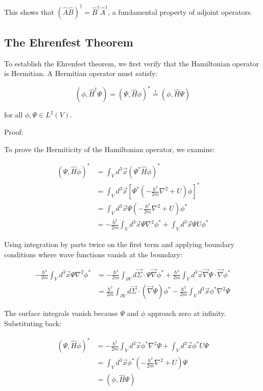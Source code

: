This shows that $(\hat{A}\hat{B})^\dagger = \hat{B}^\dagger\hat{A}^\dagger$, a fundamental property of adjoint operators.

\subsection{The Ehrenfest Theorem}

To establish the Ehrenfest theorem, we first verify that the Hamiltonian operator is Hermitian. A Hermitian operator must satisfy:

\begin{equation}
(\phi, \hat{H}^\dagger\Psi) = (\Psi, \hat{H}\phi)^* \stackrel{!}{=} (\phi, \hat{H}\Psi)
\end{equation}

for all $\phi, \Psi \in L^2(V)$.

Proof:


To prove the Hermiticity of the Hamiltonian operator, we examine:

\begin{align}
(\Psi, \hat{H}\phi)^* &= \int_V d^3\vec{x}(\Psi^*\hat{H}\phi)^* \\
&= \int_V d^3\vec{x}\left[\Psi^*\left(-\frac{\hbar^2}{2m}\nabla^2 + U\right)\phi\right]^* \\
&= \int_V d^3\vec{x}\Psi\left(-\frac{\hbar^2}{2m}\nabla^2 + U\right)\phi^*  \\
&= -\frac{\hbar^2}{2m}\int_V d^3\vec{x}\Psi\nabla^2\phi^* + \int_V d^3\vec{x}\Psi U\phi^*
\end{align}

Using integration by parts twice on the first term and applying boundary conditions where wave functions vanish at the boundary:

\begin{align}
-\frac{\hbar^2}{2m}\int_V d^3\vec{x}\Psi\nabla^2\phi^* &= -\frac{\hbar^2}{2m}\int_{\partial V}d\vec{\Sigma}\cdot\Psi\vec{\nabla}\phi^* + \frac{\hbar^2}{2m}\int_V d^3\vec{x}\vec{\nabla}\Psi\cdot\vec{\nabla}\phi^*  \\
&= \frac{\hbar^2}{2m}\int_{\partial V}d\vec{\Sigma}\cdot(\vec{\nabla}\Psi)\phi^* - \frac{\hbar^2}{2m}\int_V d^3\vec{x}\phi^*\nabla^2\Psi
\end{align}

The surface integrals vanish because $\Psi$ and $\phi$ approach zero at infinity. Substituting back:

\begin{align}
(\Psi, \hat{H}\phi)^* &= -\frac{\hbar^2}{2m}\int_V d^3\vec{x}\phi^*\nabla^2\Psi + \int_V d^3\vec{x}\phi^*U\Psi \\
&= \int_V d^3\vec{x}\phi^*\left(-\frac{\hbar^2}{2m}\nabla^2 + U\right)\Psi \\
&= (\phi, \hat{H}\Psi)
\end{align}


